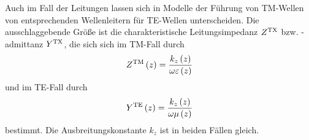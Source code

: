 





Auch im Fall der Leitungen lassen sich in Modelle der Führung von TM-Wellen von entsprechenden Wellenleitern für TE-Wellen unterscheiden. Die ausschlaggebende Größe ist die charakteristische Leitungsimpedanz $Z^{\mathrm{TX}}$ bzw. -admittanz $Y^{\mathrm{TX}}$, die sich sich im TM-Fall durch
\begin{equation}
	Z^{\mathrm{TM}}\left(z\right) = \frac{k_z\left(z\right)}{\omega \varepsilon\left(z\right)}
\end{equation}
und im TE-Fall durch
\begin{equation}
	Y^{\mathrm{TE}}\left(z\right) = \frac{k_{z}\left(z\right)}{\omega \mu\left(z\right)}
\end{equation}
bestimmt. Die Ausbreitungskonstante $k_z$ ist in beiden Fällen gleich.

